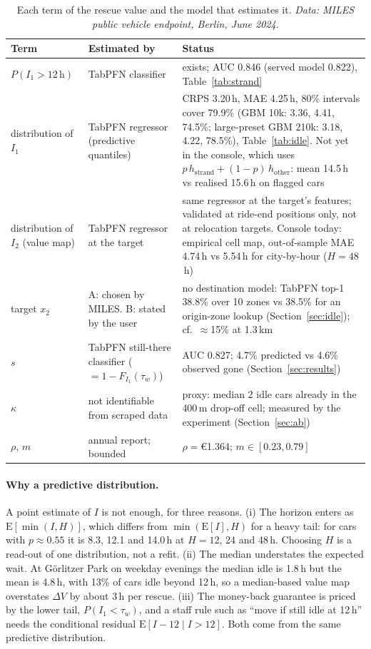 \documentclass[11pt,a4paper]{article}
\newcommand{\eur}[1]{\euro{}#1}
\begin{document}
\begin{table}[h]
\centering\small
\caption{Each term of the rescue value and the model that estimates it. \emph{Data: MILES public vehicle endpoint, Berlin, June 2024.}}
\label{tab:terms}
\begin{tabular}{@{}>{\raggedright\arraybackslash}p{3.2cm}>{\raggedright\arraybackslash}p{4.3cm}>{\raggedright\arraybackslash}p{6.6cm}@{}}
\toprule
Term & Estimated by & Status \\
\midrule
$P(I_1>12\,\mathrm{h})$ & TabPFN classifier & exists; AUC 0.846 (served model 0.822), Table~\ref{tab:strand} \\
distribution of $I_1$ & TabPFN regressor (predictive quantiles) & CRPS 3.20\,h, MAE 4.25\,h, 80\% intervals cover 79.9\% (GBM 10k: 3.36, 4.41, 74.5\%; large-preset GBM 210k: 3.18, 4.22, 78.5\%), Table~\ref{tab:idle}. Not yet in the console, which uses $p\,h_{\text{strand}}+(1-p)\,h_{\text{other}}$: mean 14.5\,h vs realised 15.6\,h on flagged cars \\
distribution of $I_2$ (value map) & TabPFN regressor at the target & same regressor at the target's features; validated at ride-end positions only, not at relocation targets. Console today: empirical cell map, out-of-sample MAE 4.74\,h vs 5.54\,h for city-by-hour ($H{=}48$\,h) \\
target $x_2$ & A: chosen by MILES. B: stated by the user & no destination model: TabPFN top-1 38.8\% over 10 zones vs 38.5\% for an origin-zone lookup (Section~\ref{sec:idle}); cf.\ $\approx$15\% at 1.3\,km~\citep{koenig2025thesis} \\
$s$ & TabPFN still-there classifier ($=1-F_{I_1}(\tau_w)$) & AUC 0.827; 4.7\% predicted vs 4.6\% observed gone (Section~\ref{sec:results}) \\
$\kappa$ & not identifiable from scraped data & proxy: median 2 idle cars already in the 400\,m drop-off cell; measured by the experiment (Section~\ref{sec:ab}) \\
$\rho$, $m$ & annual report; bounded & $\rho={}$\eur{1.364}; $m\in[0.23,0.79]$ \\
\bottomrule
\end{tabular}
\end{table}

\paragraph{Why a predictive distribution.}
A point estimate of $I$ is not enough, for three reasons. (i) The horizon enters as $\mathrm{E}[\min(I,H)]$, which differs from $\min(\mathrm{E}[I],H)$ for a heavy tail: for cars with $p\approx0.55$ it is 8.3, 12.1 and 14.0\,h at $H=12$, 24 and 48\,h. Choosing $H$ is a read-out of one distribution, not a refit. (ii) The median understates the expected wait. At G\"orlitzer Park on weekday evenings the median idle is 1.8\,h but the mean is 4.8\,h, with 13\% of cars idle beyond 12\,h, so a median-based value map overstates $\Delta V$ by about 3\,h per rescue. (iii) The money-back guarantee is priced by the lower tail, $P(I_1<\tau_w)$, and a staff rule such as ``move if still idle at 12\,h'' needs the conditional residual $\mathrm{E}[I-12\mid I>12]$. Both come from the same predictive distribution.
\end{document}

